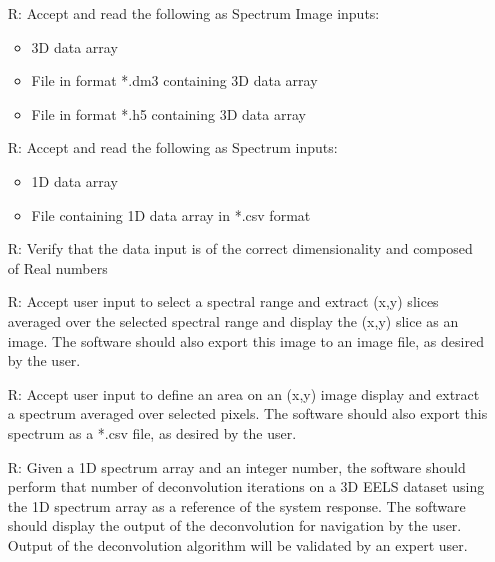 \documentclass[12pt]{article}
\newcounter{reqnum} %
\begin{document}
\noindent \begin{itemize}

\item[R\refstepcounter{reqnum}\thereqnum \label{R_Inputs}:] Accept and read the following as Spectrum Image inputs:

\begin{itemize}
	\item 3D data array
	\item File in format *.dm3 containing 3D data array
	\item File in format *.h5 containing 3D data array
\end{itemize}

\item[R\refstepcounter{reqnum}\thereqnum \label{R_Inputs}:] Accept and read the following as Spectrum inputs:

\begin{itemize}
	\item 1D data array
	\item File containing 1D data array in *.csv format
\end{itemize}

\item[R\refstepcounter{reqnum}\thereqnum \label{R_Inputs}:] Verify that the data input is of the correct dimensionality and composed of Real numbers

\item[R\refstepcounter{reqnum}\thereqnum \label{R_Inputs}:] Accept user input to select a spectral range and extract (x,y) slices averaged over the selected spectral range and display the (x,y) slice as an image. The software should also export this image to an image file, as desired by the user.

\item[R\refstepcounter{reqnum}\thereqnum \label{R_Inputs}:] Accept user input to define an area on an (x,y) image display and extract a spectrum averaged over selected pixels. The software should also export this spectrum as a *.csv file, as desired by the user.

\item[R\refstepcounter{reqnum}\thereqnum \label{R_Inputs}:] Given a 1D spectrum array and an integer number, the software should perform that number of deconvolution iterations on a 3D EELS dataset using the 1D spectrum array as a reference of the system response. The software should display the output of the deconvolution for navigation by the user. Output of the deconvolution algorithm will be validated by an expert user. 


\end{itemize}
\end{document}
